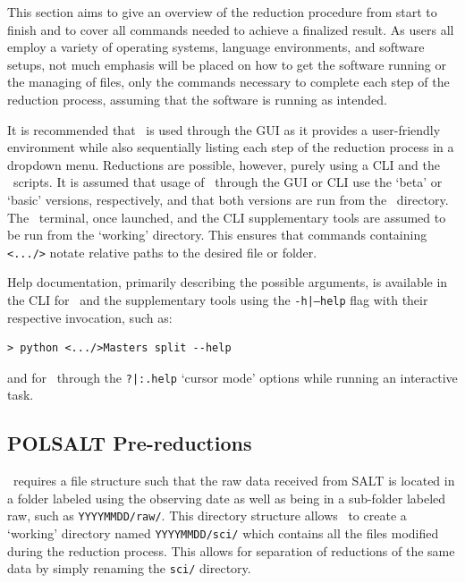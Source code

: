This section aims to give an overview of the reduction procedure from start to finish and to cover all commands needed to achieve a finalized result. As users all employ a variety of operating systems, language environments, and software setups, not much emphasis will be placed on how to get the software running or the managing of files, only the commands necessary to complete each step of the reduction process, assuming that the software is running as intended.
\prgph

It is recommended that \polsalt\ is used through the \gls{GUI} as it provides a user-friendly environment while also sequentially listing each step of the reduction process in a dropdown menu. Reductions are possible, however, purely using a \gls{CLI} and the \polsalt\ scripts. It is assumed that usage of \polsalt\ through the \gls{GUI} or \gls{CLI} use the `beta' or `basic' versions, respectively, and that both versions are run from the \polsalt\ directory. The \iraf\ terminal, once launched, and the \gls{CLI} supplementary tools are assumed to be run from the `working' directory. This ensures that commands containing \texttt{<.../>} notate relative paths to the desired file or folder.
\prgph

Help documentation, primarily describing the possible arguments, is available in the \gls{CLI} for \polsalt\ and the supplementary tools using the \texttt{-h|--help} flag with their respective invocation, such as:

\begin{verbatim}> python <.../>Masters split --help\end{verbatim}

\noindent and for \iraf\ through the \texttt{?|:.help} `cursor mode' options while running an interactive task.


\subsection{POLSALT Pre-reductions}\label{subsec:reduc_pre}

\polsalt\ requires a file structure such that the raw data received from \gls{SALT} is located in a folder labeled using the observing date as well as being in a sub-folder labeled raw, such as \texttt{YYYYMMDD/raw/}. This directory structure allows \polsalt\ to create a `working' directory named \texttt{YYYYMMDD/sci/} which contains all the files modified during the reduction process. This allows for separation of reductions of the same data by simply renaming the \texttt{sci/} directory.
\prgph

